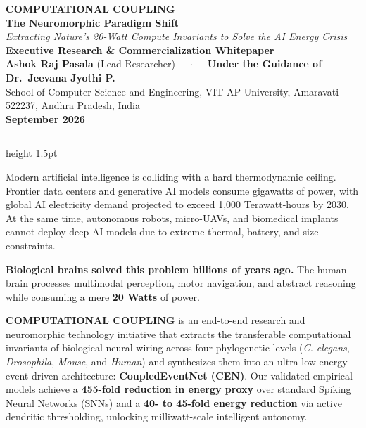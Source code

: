 \documentclass[11pt,letterpaper]{article}
\begin{document}
\begin{center}
    {\LARGE \textbf{\color{deepblue}COMPUTATIONAL COUPLING}}\\[4pt]
    {\Large \textbf{\color{brandblue}The Neuromorphic Paradigm Shift}}\\[6pt]
    {\large \textit{Extracting Nature's 20-Watt Compute Invariants to Solve the AI Energy Crisis}}\\[10pt]
    \textbf{Executive Research \& Commercialization Whitepaper}\\[4pt]
    \textbf{Ashok Raj Pasala} (Lead Researcher) $\quad \cdot \quad$ \textbf{Under the Guidance of Dr.~Jeevana Jyothi P.}\\
    \small School of Computer Science and Engineering, VIT-AP University, Amaravati 522237, Andhra Pradesh, India\\
    \small \textbf{September 2026}
\end{center}

\vspace{6pt}
\hrule height 1.5pt
\vspace{12pt}

\begin{tcolorbox}[colback=blue!5!white, colframe=brandblue, title=\textbf{Executive Summary \& The \$500 Billion AI Crisis}]
Modern artificial intelligence is colliding with a hard thermodynamic ceiling. Frontier data centers and generative AI models consume gigawatts of power, with global AI electricity demand projected to exceed 1,000 Terawatt-hours by 2030. At the same time, autonomous robots, micro-UAVs, and biomedical implants cannot deploy deep AI models due to extreme thermal, battery, and size constraints.

\textbf{Biological brains solved this problem billions of years ago.} The human brain processes multimodal perception, motor navigation, and abstract reasoning while consuming a mere \textbf{20 Watts} of power. 

\textbf{COMPUTATIONAL COUPLING} is an end-to-end research and neuromorphic technology initiative that extracts the transferable computational invariants of biological neural wiring across four phylogenetic levels (\textit{C. elegans}, \textit{Drosophila}, \textit{Mouse}, and \textit{Human}) and synthesizes them into an ultra-low-energy event-driven architecture: \textbf{CoupledEventNet (CEN)}. Our validated empirical models achieve a \textbf{455-fold reduction in energy proxy} over standard Spiking Neural Networks (SNNs) and a \textbf{40- to 45-fold energy reduction} via active dendritic thresholding, unlocking milliwatt-scale intelligent autonomy.
\end{tcolorbox}
\end{document}
